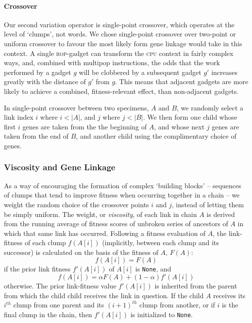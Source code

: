 \paragraph{Crossover}
Our second variation operator is single-point crossover, which
operates at the level of `clumps', not words. We chose
single-point crossover over two-point or uniform crossover
to favour the most likely form gene linkage would take in this
context. A single \textsc{rop}-gadget can transform the \textsc{cpu} context in
fairly complex ways, and, combined with multipop instructions,
the odds that the work performed by a gadget $g$ will be
clobbered by a subsequent gadget $g'$ increases greatly with the
distance of $g'$ from $g$. This means that adjacent gadgets are
more likely to achieve a combined, fitness-relevant effect, than
non-adjacent gadgets. 

In single-point crossover between two specimens, $A$ and $B$, we
randomly select a link index $i$ where $i < |A|$, and $j$ where $j
< |B|$. We then form one child whose first $i$ genes are taken
from the the beginning of $A$, and whose next $j$ genes are taken
from the end of $B$, and another child using the complimentary
choice of genes. 

\subsubsection{Viscosity and Gene Linkage}

As a way of encouraging the formation of complex `building
blocks' -- sequences of clumps that tend to improve fitness when
occurring together in a chain -- we weight the random choice of
the crossover points $i$ and $j$, instead of letting them be
simply uniform. The weight, or \emph{viscosity}, of each
link in chain $A$ is derived from the running average of fitness
scores of unbroken series of ancestors of $A$ in which that same link
has occurred. Following a fitness evaluation of $A$, the
link-fitness of each clump $f(A[i])$ (implicitly, between each
clump and its successor) is calculated on the basis of the
fitness of $A$, $F(A)$: 
  $$ f(A[i]) = F(A)$$
if the prior link fitness $f'(A[i])$ of $A[i]$ is \texttt{None},
and 
  $$ f(A[i]) = \alpha F(A) + (1-\alpha) f'(A[i]) $$
otherwise. The prior link-fitness value $f'(A[i])$ is inherited
from the parent from which the child child receives the link in
question. If the child $A$ receives its $i^{th}$ clump from one
parent and its $(i+1)^{th}$ clump from another, or if $i$ is the
final clump in the chain, then $f'(A[i])$ is initialized to
\texttt{None}.

